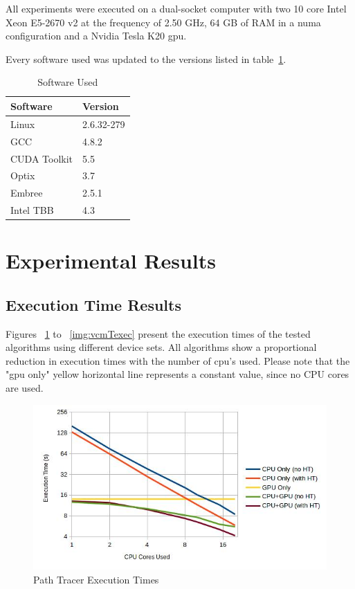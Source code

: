 
All experiments were executed on a dual-socket computer with two 10 core Intel Xeon E5-2670 v2 at the frequency of 2.50 GHz, 64 GB of RAM in a \gls{numa} configuration and a Nvidia Tesla K20 \gls{gpu}.

Every software used was updated to the versions listed in table~\ref{tab:soft_ver}.

\begin{table}[h]
\centering
\begin{tabular}{|l|l|}

\hline
Software & Version \\
\hline
Linux & 2.6.32-279 \\
\hline
GCC & 4.8.2 \\
\hline
CUDA Toolkit & 5.5 \\
\hline
Optix & 3.7 \\
\hline
Embree & 2.5.1 \\
\hline
Intel TBB & 4.3 \\
\hline
\end{tabular}
\caption{\label{tab:soft_ver} Software Used}
\end{table}

\section{Experimental Results}

\subsection{\label{sec:texec}Execution Time Results}

Figures ~\ref{img:ptTexec} to ~\ref{img:vcmTexec} present the execution times of the tested algorithms using different device sets. All algorithms show a proportional reduction in execution times with the number of \gls{cpu}'s used. Please note that the "\gls{gpu} only" yellow horizontal line represents a constant value, since no CPU cores are used.

\begin{figure}[H]
\centering
\includegraphics[width=0.8\linewidth]{img/ptTexec.jpg}
\caption{\label{img:ptTexec} Path Tracer Execution Times}
\end{figure}

